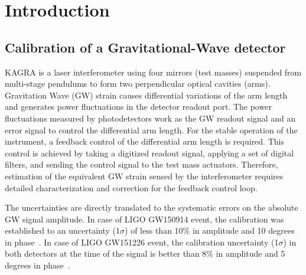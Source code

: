 
\chapter{Introduction} %

\label{Chapter1} %


\newcommand{\keyword}[1]{\textbf{#1}}
\newcommand{\tabhead}[1]{\textbf{#1}}
\newcommand{\code}[1]{\texttt{#1}}
\newcommand{\file}[1]{\texttt{\bfseries#1}}
\newcommand{\option}[1]{\texttt{\itshape#1}}


\section{Calibration of a Gravitational-Wave detector}

KAGRA is a laser interferometer using four mirrors (test masses) suspended 
from multi-stage pendulums to form two perpendicular optical cavities (arms).
Gravitation Wave (GW) strain causes differential variations of the arm length
and generates power fluctuations in the detector readout port. 
The power fluctuations measured by photodetectors work as the GW readout 
signal and an error signal to control the differential arm length. 
For the stable operation of the instrument, a feedback control of the 
differential arm length is required. This control is achieved by taking 
a digitized readout signal, applying a set of digital filters, and sending 
the control signal to the test mass actuators. Therefore, estimation 
of the equivalent GW strain sensed by the interferometer requires 
detailed characterization and correction for the feedback control loop.

The uncertainties are directly translated to the systematic errors on 
the absolute GW signal amplitude. In case of LIGO GW150914 event, 
the calibration was established to an uncertainty (1$\sigma$) of less than 
10\% in amplitude and 10 degrees in phase~\cite{GW150914}.
In case of LIGO GW151226 event, the calibration uncertainty (1$\sigma$) 
in both detectors at the time of the signal is better than 8\% 
in amplitude and 5 degrees in phase~\cite{GW151226}.

